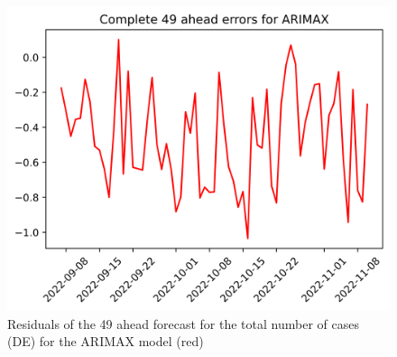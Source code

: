 \begin{figure}
\begin{minipage}{.32\textwidth}
  \label{fig:tot_cases_error_49_ARIMAX}
\end{minipage}
\begin{minipage}{.32\textwidth}
  \centering
  \includegraphics[width=\linewidth]{pics/49_ah/DE_49_ahead_errors_ARIMAX.png}
  \caption{Residuals of the 49 ahead forecast for the total number of cases (DE) for the ARIMAX model (red)}
  \label{fig:tot_cases_error_49_ARIMAX_DE}
\end{minipage}

\end{figure}
